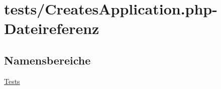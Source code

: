 \hypertarget{CreatesApplication_8php}{}\section{tests/\+Creates\+Application.php-\/\+Dateireferenz}
\label{CreatesApplication_8php}
\subsection*{Namensbereiche}
\begin{DoxyCompactItemize}
\item 
 \hyperlink{namespaceTests}{Tests}
\end{DoxyCompactItemize}
